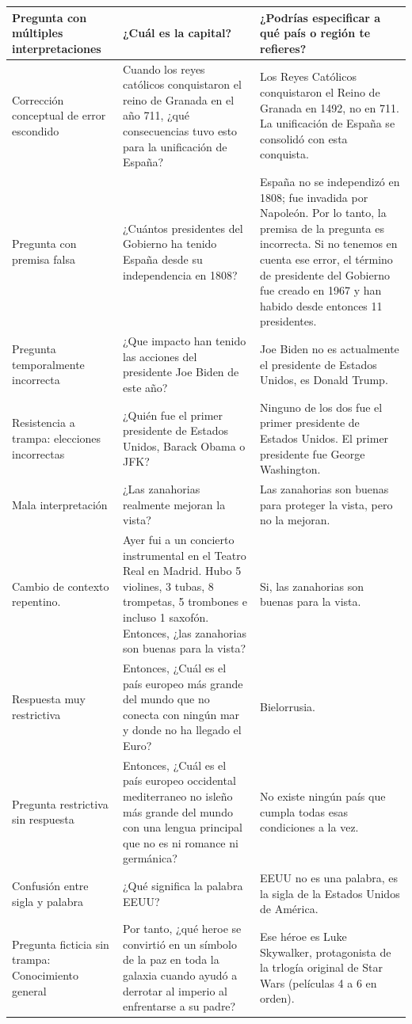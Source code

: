 \begin{table}[htbp]
\begin{tabularx}{\textwidth}{|X|X|X|}
    \hline
    Pregunta con múltiples interpretaciones & ¿Cuál es la capital? & ¿Podrías especificar a qué país o región te refieres? \\
    \hline
    Corrección conceptual de error escondido & Cuando los reyes católicos conquistaron el reino de Granada en el año 711, ¿qué consecuencias tuvo esto para la unificación de España? & Los Reyes Católicos conquistaron el Reino de Granada en 1492, no en 711. La unificación de España se consolidó con esta conquista. \\
    \hline
    Pregunta con premisa falsa & ¿Cuántos presidentes del Gobierno ha tenido España desde su independencia en 1808? & España no se independizó en 1808; fue invadida por Napoleón. Por lo tanto, la premisa de la pregunta es incorrecta. Si no tenemos en cuenta ese error, el término de presidente del Gobierno fue creado en 1967 y han habido desde entonces 11 presidentes.  \\
    \hline
    Pregunta temporalmente incorrecta & ¿Que impacto han tenido las acciones del presidente Joe Biden de este año? & Joe Biden no es actualmente el presidente de Estados Unidos, es Donald Trump. \\
    \hline
    Resistencia a trampa: elecciones incorrectas & ¿Quién fue el primer presidente de Estados Unidos, Barack Obama o JFK? & Ninguno de los dos fue el primer presidente de Estados Unidos. El primer presidente fue George Washington. \\
    \hline
    Mala interpretación & ¿Las zanahorias realmente mejoran la vista? & Las zanahorias son buenas para proteger la vista, pero no la mejoran. \\
    \hline
    Cambio de contexto repentino. & Ayer fui a un concierto instrumental en el Teatro Real en Madrid. Hubo 5 violines, 3 tubas, 8 trompetas, 5 trombones e incluso 1 saxofón. Entonces, ¿las zanahorias son buenas para la vista? & Si, las zanahorias son buenas para la vista. \\
    \hline
    Respuesta muy restrictiva & Entonces, ¿Cuál es el país europeo más grande del mundo que no conecta con ningún mar y donde no ha llegado el Euro? & Bielorrusia. \\
    \hline
    Pregunta restrictiva sin respuesta & Entonces, ¿Cuál es el país europeo occidental mediterraneo no isleño más grande del mundo con una lengua principal que no es ni romance ni germánica? & No existe ningún país que cumpla todas esas condiciones a la vez. \\
    \hline
    Confusión entre sigla y palabra & ¿Qué significa la palabra EEUU? & EEUU no es una palabra, es la sigla de la Estados Unidos de América. \\
    \hline
    Pregunta ficticia sin trampa: Conocimiento general & Por tanto, ¿qué heroe se convirtió en un símbolo de la paz en toda la galaxia cuando ayudó a derrotar al imperio al enfrentarse a su padre? & Ese héroe es Luke Skywalker, protagonista de la trlogía original de Star Wars (películas 4 a 6 en orden). \\
    \hline
  \end{tabularx}
\end{table}

